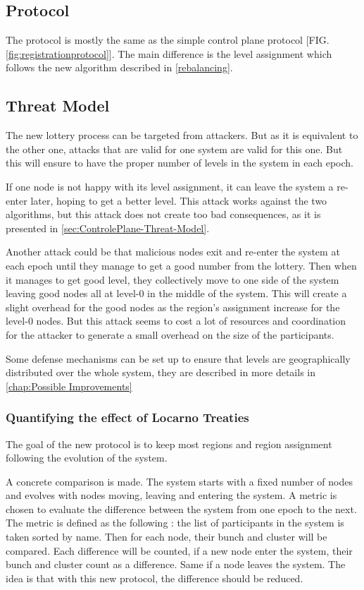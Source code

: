 \documentclass[a4paper,11pt,oneside]{report}
\begin{document}
\subsection{Protocol}
The protocol is mostly the same as the simple control plane protocol [FIG.
\autoref{fig:registrationprotocol}]. The main difference is the level assignment
which follows the new algorithm described in \autoref{rebalancing}. 

\subsection{Threat Model}

The new lottery process can be targeted from attackers. But as it is equivalent
to the other one, attacks that are valid for one system are valid for this one.
But this will ensure to have the proper number of levels in the system in each
epoch.

If one node is not happy with its level assignment, it can leave the system a
re-enter later, hoping to get a better level. This attack works against the two
algorithms, but this attack does not create too
bad consequences, as it is presented in \autoref{sec:ControlePlane-Threat-Model}.

Another attack could be that malicious nodes exit and re-enter the system at
each epoch until they manage to get a good number from the lottery. Then when
it manages to get good level, they collectively move to one side of the system
leaving good nodes all at level-0 in the middle of the system. This will create
a slight overhead for the good nodes as the region’s assignment increase for
the level-0 nodes. But this attack seems to cost a lot of resources and
coordination for the attacker to generate a small overhead on the size of the
participants.

Some defense mechanisms can be set up to ensure that levels are geographically
distributed over the whole system, they are described in more details in
\autoref{chap:Possible Improvements} 

\subsubsection{Quantifying the effect of Locarno Treaties}
The goal of the new protocol is to keep most regions and region assignment
following the evolution of the system. 

A concrete comparison is made. The system starts with a fixed number of nodes
and evolves with nodes moving, leaving and entering the system. A metric is
chosen to evaluate the difference between the system from one epoch to the
next. The metric is defined as the following :  the list of participants in the
system is taken sorted by name. Then for each node, their bunch and cluster
will be compared. Each difference will be counted, if a new node enter the
system, their bunch and cluster count as a difference. Same if a node leaves
the system. The idea is that with this new protocol, the difference should be
reduced. 
\end{document}
